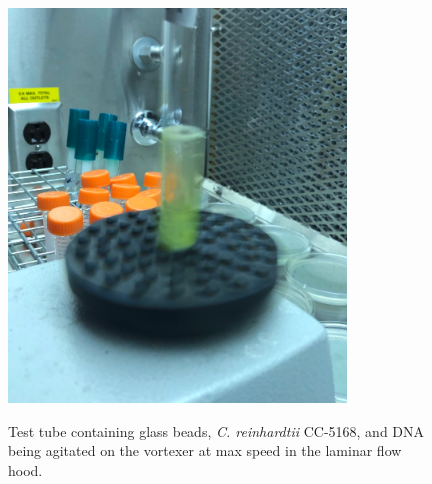 \begin{figure}[!htbp]
    \centering
    \includegraphics[width=0.8\textwidth]{images/chap3/algae/image3.png}
    \label{fig:ch3algae03}
    \caption{Test tube containing glass beads, \textit{C. reinhardtii} CC-5168, and DNA being agitated on the vortexer at max speed in the laminar flow hood.} 
\end{figure}
\FloatBarrier